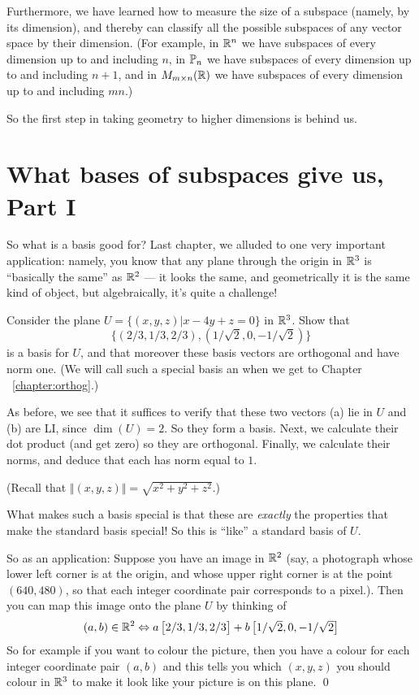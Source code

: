 Furthermore, we have learned how to measure the size of a subspace
(namely, by its dimension), and thereby can classify all the possible
subspaces of any vector space by their dimension.  (For example,
in $\mathbb{R}^n$ we have subspaces of every dimension up to and including $n$,
in $\mathbb{P}_n$ we have subspaces of every dimension up to and including $n+1$,
and in $M_{m\times n}(\mathbb{R})$ we have subspaces of every dimension up to and including $mn$.)

So the first step in taking geometry to higher dimensions is behind us.

\section{What bases of subspaces give us, Part I}

So what is a basis good for?  Last chapter, we alluded to one 
very important application:  namely, you know that any
plane through the origin in $\mathbb{R}^3$ is ``basically the same''
as $\mathbb{R}^2$ --- it looks the same, and geometrically it is
the same kind of object, but algebraically, it's quite
a challenge!

\begin{myprob} Consider the plane $U = \{ (x,y,z) | x-4y+z = 0\}$ in $\mathbb{R}^3$.
Show that $$\{(2/3,1/3,2/3), (1/\sqrt{2},0,-1/\sqrt{2})\}$$ is
a basis for $U$, and that moreover these basis vectors are
orthogonal and have norm one.  (We will call such a special basis
an  when we get to Chapter ~\ref{chapter:orthog}.)   

\begin{mysol}  As before, we see that it suffices to verify that these two
vectors (a) lie in $U$ and (b) are LI, since $\dim(U)=2$.  So
they form a basis.  Next, we calculate their dot product (and get
zero) so they are orthogonal.  Finally, we calculate their
norms, and deduce that each has norm equal to $1$.

(Recall that $\Vert (x,y,z) \Vert = \sqrt{x^2+y^2+z^2}$.)\end{mysol}\end{myprob}


What makes such a basis special is that these are \emph{exactly}
the properties that make the standard basis special!  So
this is ``like'' a standard basis of $U$.

So as an application:  Suppose you have an image in $\mathbb{R}^2$
(say, a photograph whose lower left corner is at the origin,
and whose upper right corner is at the point $(640,480)$, so
that each integer coordinate pair corresponds to a pixel.).
Then you can map this image onto the plane $U$ by thinking
of 
$$
(a,b) \in \mathbb{R}^2 \Leftrightarrow a\left[ \begin{matrix} 2/3,1/3,2/3 \end{matrix} \right] + b\left[ \begin{matrix} 1/\sqrt{2},0,-1/\sqrt{2} \end{matrix} \right]
$$
So for example if you want to colour the picture, then you have a colour
for each integer coordinate pair $(a,b)$ and this tells you which 
$(x,y,z)$ you should colour in $\mathbb{R}^3$ to make it look like your
picture is on this plane.
\qed


